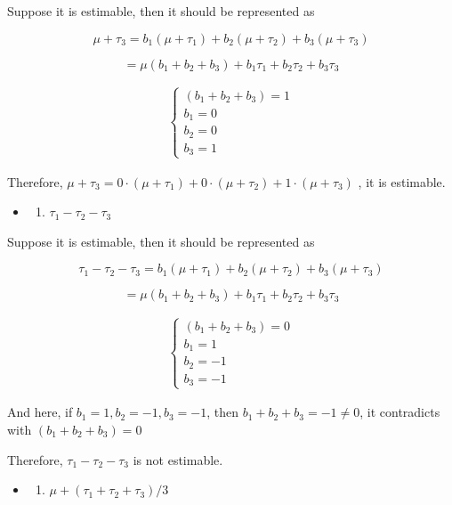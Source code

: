 \documentclass[11pt]{article}
\providecommand{\tightlist}{%
      \setlength{\itemsep}{0pt}\setlength{\parskip}{0pt}}
\begin{document}
Suppose it is estimable, then it should be represented as

\[\mu + \tau_3 = b_1 (\mu + \tau_1) + b_2 (\mu + \tau_2) + b_3 (\mu + \tau_3)\]

\[= \mu (b_1+b_2+b_3) + b_1 \tau_1 + b_2 \tau_2 + b_3 \tau_3\]

\begin{align}
\left\{\begin{matrix} (b_1+b_2+b_3) =1
\\ b_1 = 0
\\ b_2 = 0
\\ b_3 = 1
\end{matrix}\right.
\end{align}

Therefore,
\(\mu + \tau_3 = 0 \cdot (\mu + \tau_1) + 0 \cdot (\mu + \tau_2) + 1 \cdot (\mu + \tau_3)\)
, it is estimable.



\begin{itemize}
\item
  \begin{enumerate}
  \def\labelenumi{\alph{enumi})}
  \setcounter{enumi}{2}
  \tightlist
  \item
    \(\tau_1-\tau_2-\tau_3\)
  \end{enumerate}
\end{itemize}

Suppose it is estimable, then it should be represented as

\[\tau_1-\tau_2-\tau_3 = b_1 (\mu + \tau_1) + b_2 (\mu + \tau_2) + b_3 (\mu + \tau_3)\]

\[= \mu (b_1+b_2+b_3) + b_1 \tau_1 + b_2 \tau_2 + b_3 \tau_3\]

\begin{align}
\left\{\begin{matrix} (b_1+b_2+b_3) =0
\\ b_1 = 1
\\ b_2 = -1
\\ b_3 = -1
\end{matrix}\right.
\end{align}

And here, if \(b_1 = 1, b_2 = -1, b_3 = -1\), then
\(b_1+b_2+b_3 = -1 \neq 0\), it contradicts with  \( (b_1+b_2+b_3)
=0\)

Therefore, \(\tau_1-\tau_2-\tau_3\) is not estimable.



\begin{itemize}
\item
  \begin{enumerate}
  \def\labelenumi{\alph{enumi})}
  \setcounter{enumi}{3}
  \tightlist
  \item
    \(\mu + (\tau_1 + \tau_2 + \tau_3) /3\)
  \end{enumerate}
\end{itemize}
\end{document}
